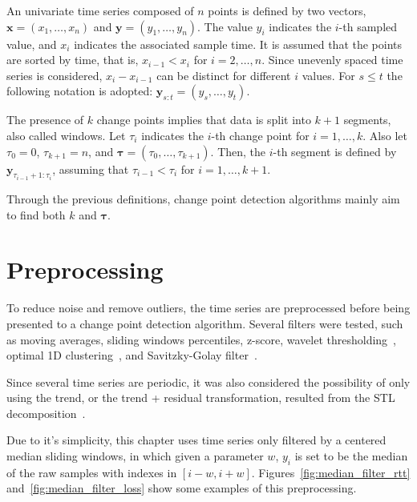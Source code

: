 An univariate time series composed of $n$ points is defined by two vectors,
$\mathbf{x} = (x_{1}, \ldots, x_{n})$ and $\mathbf{y} = (y_{1}, \ldots, y_{n})$.
The value $y_{i}$ indicates the $i$-th sampled value, and $x_{i}$ indicates the
associated sample time. It is assumed that the points are sorted by time, that
is, $x_{i - 1} < x_{i}$ for $i = 2, \ldots, n$. Since unevenly spaced time
series is considered, $x_{i} - x_{i - 1}$ can be distinct for different $i$
values. For $s \le t$ the following notation is adopted:
$\mathbf{y}_{s:t} = (y_{s}, \ldots, y_{t})$.

The presence of $k$ change points implies that data is split into $k+1$
segments, also called windows. Let $\tau_{i}$ indicates the $i$-th change point
for $i=1, \ldots, k$. Also let $\tau_{0} = 0$, $\tau_{k + 1} = n$, and
$\boldsymbol \tau = (\tau_{0}, \ldots, \tau_{k + 1})$. Then, the $i$-th segment
is defined by $\mathbf{y}_{\tau_{i - 1} + 1 : \tau_{i}}$, assuming that
$\tau_{i - 1} < \tau_{i}$ for $i = 1, \ldots, k + 1$.

Through the previous definitions, change point detection algorithms mainly aim
to find both $k$ and $\boldsymbol \tau$.

\section{Preprocessing}

To reduce noise and remove outliers, the time series are
preprocessed before being presented to a change point detection algorithm.
Several filters were tested, such as moving averages, sliding windows
percentiles, z-score,
wavelet thresholding~\cite{an_introduction_to_wavelets}, optimal 1D
clustering~\cite{ckmeans_1d_dp_optimal_k_means_clustering_in_one_dimension_by_dynamic_programming},
and Savitzky-Golay filter~\cite{savgol}.

Since several time series are
periodic, it was also considered the possibility of only using the
trend, or the trend + residual transformation,
resulted from the STL
decomposition~\cite{stl_a_seasonal_trend_decomposition_procedure_based_on_loess}.

Due to it's simplicity,
this chapter uses time series only filtered by a centered median
sliding windows, in which given a parameter $w$, $y_{i}$ is set to be
the median of the raw samples with indexes in $[i-w, i+w]$.
Figures~\ref{fig:median_filter_rtt} and~\ref{fig:median_filter_loss} show
some examples of this preprocessing.

